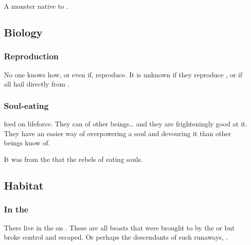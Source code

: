 \section{\Umbra}
\index{\umbra}
A monster native to \Erebos. 









\subsection{Biology}






\subsubsection{Reproduction}
No one knows how, or even if, \umbrae{} reproduce. 
It is unknown if they reproduce , or if all \umbrae{} hail directly from \Erebos. 





\subsubsection{Soul-eating}
\Umbrae{} feed on lifeforce. 
They can  of other beings\ldots{} and they are frighteningly good at it. 
They have an easier way of overpowering a soul and devouring it than other beings know of. 

It was from the \umbrae{} that the \Merkyran{} rebels  of eating souls. 









\subsection{Habitat}





\subsubsection{In the \Wylde}
There live \umbrae{} in the \Wylde{} on \Miith. 
These are all beasts that were brought to \Miith{} by the \resphain{} or \banes{} but broke control and escaped. 
Or perhaps the descendants of such runaways, . 

